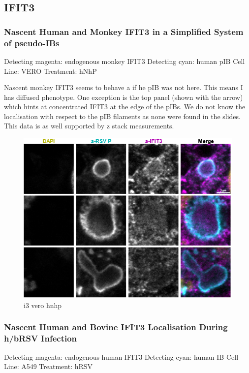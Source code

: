 \subsection{IFIT3} \label{subsec:IFIT3}
\subsubsection{Nascent Human and Monkey IFIT3 in a Simplified System of pseudo-IBs} \label{Nascent Human and Monkey IFIT3 in a Simplified System of pseudo-IBs}
Detecting magenta: endogenous monkey IFIT3 \newline
Detecting cyan: human pIB \newline
Cell Line: VERO \newline
Treatment: hNhP \newline

Nascent monkey IFIT3 seems to behave a if he pIB was not here. This means I has diffused phenotype. One exception is the top panel (shown with the arrow) which hints at concentrated IFIT3 at the edge of the pIBs. We do not know the localisation with respect to the pIB filaments as none were found in the slides. This data is as well supported by z stack measurements.

\begin{figure}
    \centering
    \includegraphics[width=1\linewidth]{09. Chapter 4/Figs/04. IFIT3/01. vero hnhp.png}
    \caption[i3 vero hnhp]{i3 vero hnhp}
    \label{fig:i3 vero hnhp}
\end{figure}

\subsubsection{Nascent Human and Bovine IFIT3 Localisation During h/bRSV Infection} \label{Nascent Human and Bovine IFIT3 Localisation During h/bRSV Infection}
 \label{hIFIT3 Localisation During hRSV Infection}
Detecting magenta: endogenous human IFIT3 \newline
Detecting cyan: human IB \newline
Cell Line: A549 \newline
Treatment: hRSV \newline

